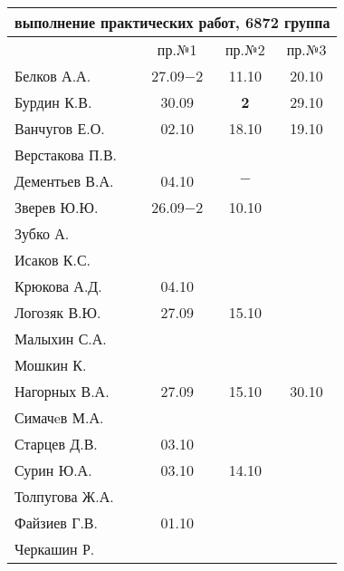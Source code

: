 \documentclass[a4paper,landscape,11pt]{article}
\begin{document}
\newpage
\begin{tabular}{l|ccc}
\multicolumn{4}{c}{выполнение практических работ, 6872 группа} \\
\toprule
& пр.№1 & пр.№2 & пр.№3 \\
\midrule
Белков А.А.    &27.09$-2$&11.10  &20.10\\   
Бурдин К.В.    &30.09    &{\bf 2}&29.10\\
Ванчугов Е.О.  &02.10    &18.10  &19.10\\
Верстакова П.В.&         &       &\\
Дементьев В.А. &04.10    &$-$    &\\
Зверев Ю.Ю.    &26.09$-2$&10.10  &\\
Зубко А.       &         &       &\\
Исаков К.С.    &         &       &\\
Крюкова А.Д.   &04.10    &       &\\
Логозяк В.Ю.   &27.09    &15.10  &\\
Малыхин С.А.   &         &       &\\
Мошкин К.      &         &       &\\
Нагорных В.А.  &27.09    &15.10  &30.10\\
Симачeв М.А.   &         &       &\\
Старцев Д.В.   &03.10    &       &\\
Сурин Ю.А.     &03.10    &14.10  &\\
Толпугова Ж.А. &         &       &\\
Файзиев Г.В.   &01.10    &       &\\
Черкашин Р.    &         &       &\\
\bottomrule
\end{tabular}
\end{document}
